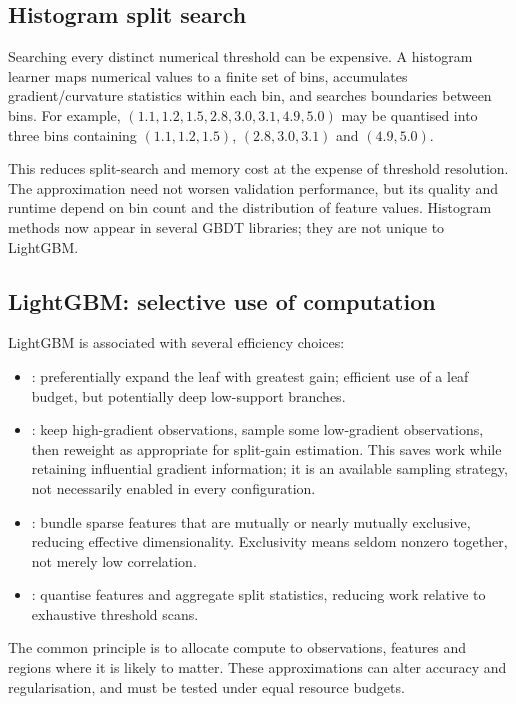 \subsection{Histogram split search}
\label{subsec:trees-histogram-split-search}
Searching every distinct numerical threshold can be expensive.
A histogram learner maps numerical values to a finite set of bins, accumulates gradient/curvature statistics within each bin, and searches boundaries between bins.
For example, $(1.1,1.2,1.5,2.8,3.0,3.1,4.9,5.0)$ may be quantised into three bins containing $(1.1,1.2,1.5)$, $(2.8,3.0,3.1)$ and $(4.9,5.0)$.

This reduces split-search and memory cost at the expense of threshold resolution.
The approximation need not worsen validation performance, but its quality and runtime depend on bin count and the distribution of feature values.
Histogram methods now appear in several GBDT libraries; they are not unique to LightGBM.

\subsection{LightGBM: selective use of computation}
\label{subsec:trees-lightgbm-selective-use-of-computation}
LightGBM is associated with several efficiency choices:
\begin{itemize}
\item {}: preferentially expand the leaf with greatest gain; efficient use of a leaf budget, but potentially deep low-support branches.
\item {}: keep high-gradient observations, sample some low-gradient observations, then reweight as appropriate for split-gain estimation.
This saves work while retaining influential gradient information; it is an available sampling strategy, not necessarily enabled in every configuration.
\item {}: bundle sparse features that are mutually or nearly mutually exclusive, reducing effective dimensionality.
Exclusivity means seldom nonzero together, not merely low correlation.
\item {}: quantise features and aggregate split statistics, reducing work relative to exhaustive threshold scans.
\end{itemize}
The common principle is to allocate compute to observations, features and regions where it is likely to matter.
These approximations can alter accuracy and regularisation, and must be tested under equal resource budgets.

